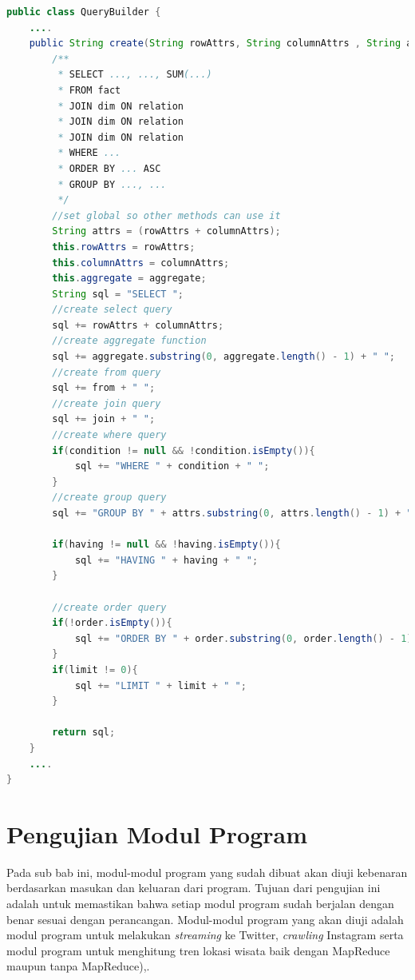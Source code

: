 \begin{lstlisting}[language=Java,basicstyle=\tiny,caption=QueryBuilder.java,label={lst:kode_bi_server_reporting_3}]
public class QueryBuilder {
    ....
    public String create(String rowAttrs, String columnAttrs , String aggregate, String condition, String order, int limit, String having){
        /**
         * SELECT ..., ..., SUM(...)
         * FROM fact
         * JOIN dim ON relation
         * JOIN dim ON relation
         * JOIN dim ON relation
         * WHERE ...
         * ORDER BY ... ASC
         * GROUP BY ..., ...
         */
        //set global so other methods can use it
        String attrs = (rowAttrs + columnAttrs);
        this.rowAttrs = rowAttrs;
        this.columnAttrs = columnAttrs;
        this.aggregate = aggregate;
        String sql = "SELECT ";
        //create select query
        sql += rowAttrs + columnAttrs;
        //create aggregate function
        sql += aggregate.substring(0, aggregate.length() - 1) + " ";
        //create from query
        sql += from + " ";
        //create join query
        sql += join + " ";
        //create where query
        if(condition != null && !condition.isEmpty()){
            sql += "WHERE " + condition + " ";
        }
        //create group query
        sql += "GROUP BY " + attrs.substring(0, attrs.length() - 1) + " ";
        
        if(having != null && !having.isEmpty()){
            sql += "HAVING " + having + " ";
        }
        
        //create order query
        if(!order.isEmpty()){
            sql += "ORDER BY " + order.substring(0, order.length() - 1) + " ";
        }
        if(limit != 0){
            sql += "LIMIT " + limit + " ";
        }
        
        return sql;
    }
    ....
}
\end{lstlisting}

\section{Pengujian Modul Program}
Pada sub bab ini, modul-modul program yang sudah dibuat akan diuji kebenaran berdasarkan masukan dan keluaran dari program. Tujuan dari pengujian ini adalah untuk memastikan bahwa setiap modul program sudah berjalan dengan benar sesuai dengan perancangan. Modul-modul program yang akan diuji adalah modul program untuk melakukan \textit{streaming} ke Twitter, \textit{crawling} Instagram serta modul program untuk menghitung tren lokasi wisata baik dengan MapReduce maupun tanpa MapReduce),.

